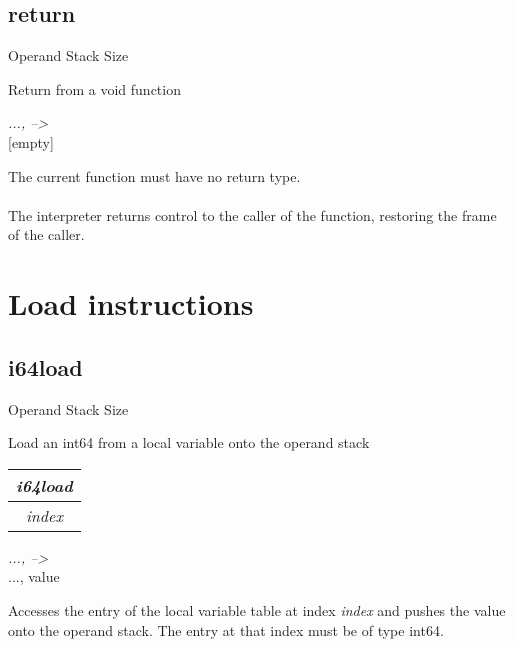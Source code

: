 \documentclass[12pt]{article}
\begin{document}
		\subsection*{return}
			\begin{labeling}{Operand Stack Size}
				\item [\textbf{Operation}] Return from a void function
				\item [\textbf{Format}] 
				\item [\textbf{Operand Stack}] \textit{..., --\textgreater } \\
										{[empty]}
				\item [\textbf{Description}] 	The current function must have no return type. \\ \\
				The interpreter returns control to the caller of the function, restoring the frame of the caller. 
			\end{labeling} 
		\newpage
		
	\section{Load instructions}
		\subsection*{i64load}
			\begin{labeling}{Operand Stack Size}
				\item [\textbf{Operation}] Load an int64 from a local variable onto the operand stack
				\item [\textbf{Format}] \begin{tabular}{| c |} \hline \textit{i64load} \\ \hline \textit{index} \\ \hline \end{tabular}
				\item [\textbf{Operand Stack}] \textit{..., --\textgreater } \\
										{..., value}
				\item [\textbf{Description}] 	Accesses the entry of the local variable table at index \textit{index} and pushes the value onto the operand stack. The entry at that index must be of type int64. 
			\end{labeling}
		\newpage 
		
\end{document}
